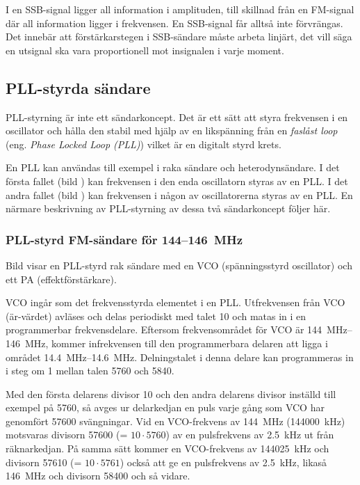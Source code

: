 I en SSB-signal ligger all information i amplituden, till skillnad
från en FM-signal där all information ligger i frekvensen.
En SSB-signal får alltså inte förvrängas.
Det innebär att förstärkarstegen i SSB-sändare måste arbeta linjärt, det vill
säga en utsignal ska vara proportionell mot insignalen i varje moment.

\subsection{PLL-styrda sändare}

PLL-styrning är inte ett sändarkoncept.
Det är ett sätt att styra frekvensen i en oscillator och hålla den stabil med
hjälp av en likspänning från en \emph{faslåst loop} (eng.
\emph{Phase Locked Loop (PLL)}) vilket är en digitalt styrd krets.

En PLL kan användas till exempel i raka sändare och heterodynsändare.
I det första fallet (bild ) kan frekvensen i den enda
oscillatorn styras av en PLL.
I det andra fallet (bild ) kan frekvensen i
någon av oscillatorerna styras av en PLL.
En närmare beskrivning av PLL-styrning av dessa två sändarkoncept följer här.

\subsubsection{PLL-styrd FM-sändare för 144--146~MHz}


Bild  visar en PLL-styrd rak sändare med en
VCO (spänningsstyrd oscillator) och ett PA (effektförstärkare).

VCO ingår som det frekvensstyrda elementet i en PLL.
Utfrekvensen från VCO (är-värdet) avläses och delas periodiskt med talet 10
och matas in i en programmerbar frekvensdelare.
Eftersom frekvensområdet för VCO är \SIrange{144}{146}{\mega\hertz}, kommer
infrekvensen till den programmerbara delaren att ligga i området
\SIrange{14,4}{14,6}{\mega\hertz}.
Delningstalet i denna delare kan programmeras in i steg om 1 mellan
talen 5760 och 5840.

Med den första delarens divisor 10 och den andra delarens divisor
inställd till exempel på 5760, så avges ur delarkedjan en puls varje gång som
VCO har genomfört 57600 svängningar.
Vid en VCO-frekvens av \qty{144}{\mega\hertz} (\qty{144000}{\kilo\hertz}) motsvaras
divisorn 57600 (= \(10 \cdot 5760\)) av en pulsfrekvens av \qty{2,5}{\kilo\hertz}
ut från räknarkedjan.
På samma sätt kommer en VCO-frekvens av \qty{144025}{\kilo\hertz} och divisorn
57610 (= \(10 \cdot 5761\)) också att ge en pulsfrekvens av
\qty{2,5}{\kilo\hertz}, likaså \qty{146}{\mega\hertz} och divisorn 58400 och så
vidare.


